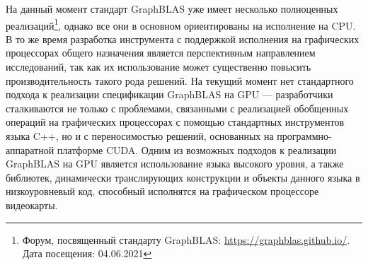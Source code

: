 На данный момент стандарт GraphBLAS уже имеет несколько полноценных реализаций\footnote{Форум, посвященный стандарту GraphBLAS: \url{https://graphblas.github.io/}. Дата посещения: 04.06.2021}, однако все они в основном ориентированы на исполнение на CPU. В то же время разработка инструмента с поддержкой исполнения на графических процессорах общего назначения является перспективным направлением исследований, так как их использование может существенно повысить производительность такого рода решений\cite{gbtl}\cite{blast}. На текущий момент нет стандартного подхода к реализации спецификации GraphBLAS на GPU --- разработчики сталкиваются не только с проблемами, связанными с реализацией обобщенных операций на графических процессорах с помощью стандартных инструментов языка C++, но и с переносимостью решений, основанных на программно-аппаратной платформе CUDA. Одним из возможных подходов к реализации GraphBLAS на GPU является использование языка высокого уровня, а также библиотек, динамически транслирующих конструкции и объекты данного языка в низкоуровневый код, способный исполнятся на графическом процессоре видеокарты. 
